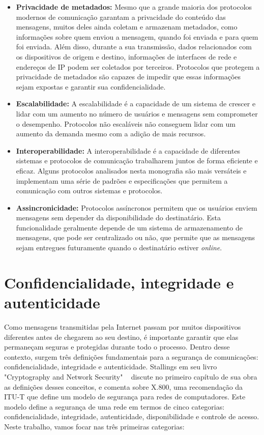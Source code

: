 \begin{itemize}
    \item \textbf{Privacidade de metadados:} Mesmo que a grande maioria dos protocolos modernos de comunicação garantam a privacidade do conteúdo das mensagens, muitos deles ainda coletam e armazenam metadados, como informações sobre quem enviou a mensagem, quando foi enviada e para quem foi enviada. Além disso, durante a sua transmissão, dados relacionados com os dispositivos de origem e destino, informações de interfaces de rede e endereços de IP podem ser coletados por terceiros. Protocolos que protegem a privacidade de metadados são capazes de impedir que essas informações sejam expostas e garantir sua confidencialidade.
    
    \item \textbf{Escalabilidade:} A escalabilidade é a capacidade de um sistema de crescer e lidar com um aumento no número de usuários e mensagens sem comprometer o desempenho. Protocolos não escaláveis não conseguem lidar com um aumento da demanda mesmo com a adição de mais recursos.
    
    \item \textbf{Interoperabilidade:} A interoperabilidade é a capacidade de diferentes sistemas e protocolos de comunicação trabalharem juntos de forma eficiente e eficaz. Alguns protocolos analisados nesta monografia são mais versáteis e implementam uma série de padrões e especificações que permitem a comunicação com outros sistemas e protocolos.

    \item \textbf{Assincronicidade:} Protocolos assíncronos permitem que os usuários enviem mensagens sem depender da disponibilidade do destinatário. Esta funcionalidade geralmente depende de um sistema de armazenamento de mensagens, que pode ser centralizado ou não, que permite que as mensagens sejam entregues futuramente quando o destinatário estiver \textit{online}.
\end{itemize}

\section{Confidencialidade, integridade e autenticidade}

Como mensagens transmitidas pela Internet passam por muitos dispositivos diferentes antes de chegarem ao seu destino, é importante garantir que elas permaneçam seguras e protegidas durante todo o processo. Dentro desse contexto, surgem três definições fundamentais para a segurança de comunicações: confidencialidade, integridade e autenticidade. Stallings em seu livro "Cryptography and Network Security" ~\cite{Stallings2017} discute no primeiro capítulo de sua obra as definições desses conceitos, e comenta sobre X.800, uma recomendação da ITU-T que define um modelo de segurança para redes de computadores. Este modelo define a segurança de uma rede em termos de cinco categorias: confidencialidade, integridade, autenticidade, disponibilidade e controle de acesso. Neste trabalho, vamos focar nas três primeiras categorias:

